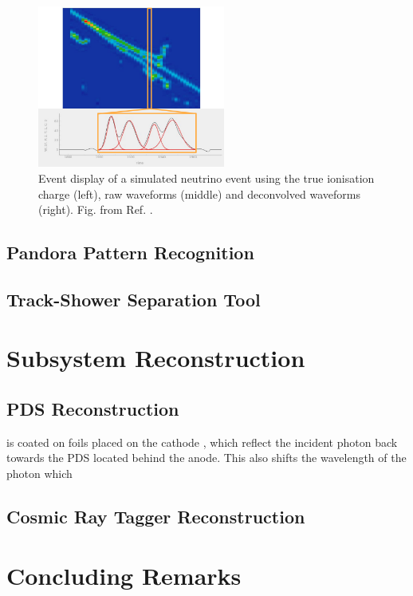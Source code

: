 \begin{figure}[htbp!] 
\centering    
\includegraphics[width=0.55\textwidth]{gaushit}
\caption[gaushit]{
Event display of a simulated neutrino event using the true ionisation charge (left), raw waveforms (middle) and deconvolved waveforms (right).
Fig. from Ref. \cite{}.
}
\label{fig:gaushit}
\end{figure}

\subsection{Pandora Pattern Recognition}

\subsection{Track-Shower Separation Tool}

\section{Subsystem Reconstruction}

\subsection{PDS Reconstruction}
is coated on foils placed on the cathode
, which reflect the incident photon back towards the PDS located behind the anode. 
This also shifts the wavelength of the photon which 


\subsection{Cosmic Ray Tagger Reconstruction}


\section{Concluding Remarks}
